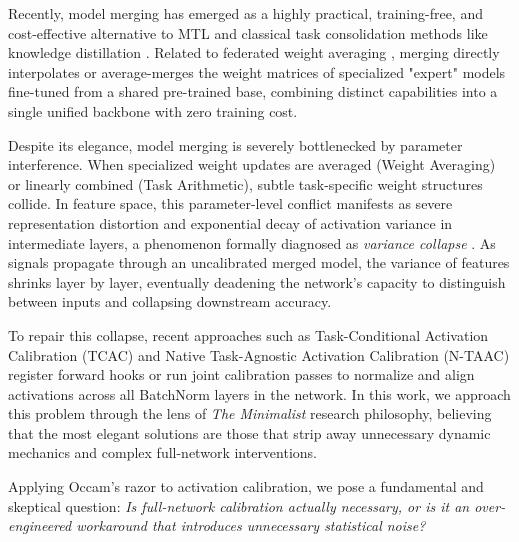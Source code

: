 \documentclass{article}
\theoremstyle{plain}
\theoremstyle{definition}
\begin{document}
Recently, model merging has emerged as a highly practical, training-free, and cost-effective alternative to MTL \cite{ilharco2022editing, wortsman2022model} and classical task consolidation methods like knowledge distillation \cite{hinton2015distilling}. Related to federated weight averaging \cite{pmlr-v54-mcmahan17a}, merging directly interpolates or average-merges the weight matrices of specialized "expert" models fine-tuned from a shared pre-trained base, combining distinct capabilities into a single unified backbone with zero training cost.

Despite its elegance, model merging is severely bottlenecked by parameter interference. When specialized weight updates are averaged (Weight Averaging) or linearly combined (Task Arithmetic), subtle task-specific weight structures collide. In feature space, this parameter-level conflict manifests as severe representation distortion and exponential decay of activation variance in intermediate layers, a phenomenon formally diagnosed as \textit{variance collapse} \cite{jordan2022repair}. As signals propagate through an uncalibrated merged model, the variance of features shrinks layer by layer, eventually deadening the network's capacity to distinguish between inputs and collapsing downstream accuracy.

To repair this collapse, recent approaches such as Task-Conditional Activation Calibration (TCAC) and Native Task-Agnostic Activation Calibration (N-TAAC) register forward hooks or run joint calibration passes to normalize and align activations across all BatchNorm layers in the network. In this work, we approach this problem through the lens of \textit{The Minimalist} research philosophy, believing that the most elegant solutions are those that strip away unnecessary dynamic mechanics and complex full-network interventions. 

Applying Occam's razor to activation calibration, we pose a fundamental and skeptical question: \textit{Is full-network calibration actually necessary, or is it an over-engineered workaround that introduces unnecessary statistical noise?}
\end{document}
